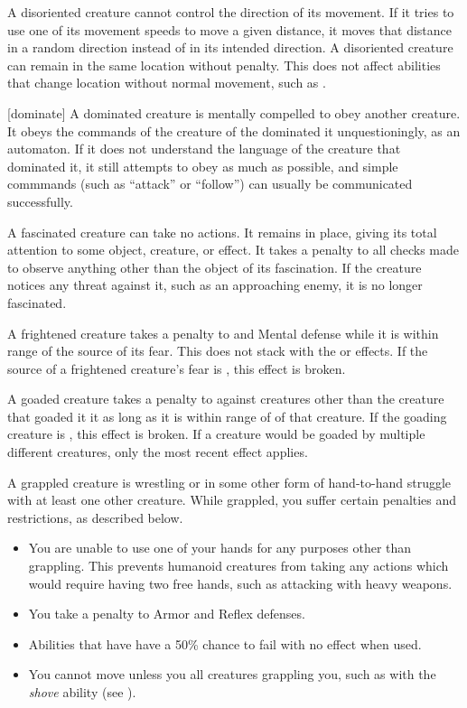  A disoriented creature cannot control the direction of its movement.
If it tries to use one of its movement speeds to move a given distance, it moves that distance in a random direction instead of in its intended direction.
A disoriented creature can remain in the same location without penalty.
This does not affect abilities that change location without normal movement, such as .

[dominate] A dominated creature is mentally compelled to obey another creature.
It obeys the commands of the creature of the dominated it unquestioningly, as an automaton.
If it does not understand the language of the creature that dominated it, it still attempts to obey as much as possible, and simple commmands (such as ``attack'' or ``follow'') can usually be communicated successfully.

 A fascinated creature can take no actions. It remains in place, giving its total attention to some object, creature, or effect. It takes a  penalty to all checks made to observe anything other than the object of its fascination.
If the creature notices any threat against it, such as an approaching enemy, it is no longer fascinated.

 A frightened creature takes a  penalty to  and Mental defense while it is within \rngmed range of the source of its fear.
This does not stack with the \shaken or \panicked effects.
If the source of a frightened creature's fear is , this effect is broken.

 A goaded creature takes a  penalty to  against creatures other than the creature that goaded it it as long as it is within \rngmed range of of that creature.
If the goading creature is , this effect is broken.
If a creature would be goaded by multiple different creatures, only the most recent effect applies.

 A grappled creature is wrestling or in some other form of hand-to-hand struggle with at least one other creature.
While grappled, you suffer certain penalties and restrictions, as described below.
\begin{itemize}
    \item You are unable to use one of your hands for any purposes other than grappling.
        This prevents humanoid creatures from taking any actions which would require having two free hands, such as attacking with heavy weapons.
    \item You take a  penalty to Armor and Reflex defenses.
    \item Abilities that have  have a 50\% chance to fail with no effect when used.
    \item You cannot move unless you  all creatures grappling you, such as with the \textit{shove} ability (see ).
\end{itemize}

